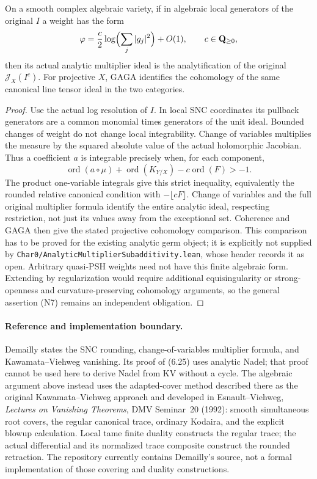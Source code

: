 \begin{lemma}
\label{lem:kn-nadel-algebraic-analytic-comparison}
\notready
On a smooth complex algebraic variety, if in algebraic local
generators of the original $I$ a weight has the form
\[
 \varphi=\frac c2\log\Bigl(\sum_j|g_j|^2\Bigr)+O(1),
 \qquad c\in\mathbf{Q}_{\geq0},
\]
then its actual analytic multiplier ideal is the analytification of
the original $\mathcal J_X(I^c)$.  For projective $X$, GAGA identifies
the cohomology of the same canonical line tensor ideal in the two
categories.
\end{lemma}
\begin{proof}
Use the actual log resolution of $I$.  In local SNC coordinates its
pullback generators are a common monomial times generators of the
unit ideal.  Bounded changes of weight do not change local
integrability.  Change of variables multiplies the measure by the
squared absolute value of the actual holomorphic Jacobian.  Thus a
coefficient $a$ is integrable precisely when, for each component,
\[
 \operatorname{ord}(a\circ\mu)
 +\operatorname{ord}(K_{Y/X})-c\operatorname{ord}(F)>-1.
\]
The product one-variable integrals give this strict inequality,
equivalently the rounded relative canonical condition with
$-\lfloor cF\rfloor$.  Change of variables and the full original
multiplier formula identify the entire analytic ideal, respecting
restriction, not just its values away from the exceptional set.
Coherence and GAGA then give the stated projective cohomology
comparison.  This comparison has to be proved for the existing
analytic germ object; it is explicitly not supplied by
\texttt{Char0/AnalyticMultiplierSubadditivity.lean}, whose header
records it as open.  Arbitrary quasi-PSH weights need not have this
finite algebraic form.  Extending by regularization would require
additional equisingularity or strong-openness and curvature-preserving
cohomology arguments, so the general assertion (N7) remains an
independent obligation.
\end{proof}

\paragraph{Reference and implementation boundary.}
Demailly \cite[\S6.D, especially (6.23)--(6.25)]{DemAM} states the
SNC rounding, change-of-variables multiplier formula, and
Kawamata--Viehweg vanishing.  Its proof of (6.25) uses analytic Nadel;
that proof cannot be used here to derive Nadel from KV without a
cycle.  The algebraic argument above instead uses the adapted-cover
method described there as the original Kawamata--Viehweg approach
and developed in Esnault--Viehweg, \emph{Lectures on Vanishing
Theorems}, DMV Seminar~20 (1992): smooth simultaneous root covers,
the regular canonical trace, ordinary Kodaira, and the explicit blowup
calculation.  Local tame finite duality constructs the regular trace;
the actual differential and its normalized trace composite construct
the rounded retraction.
The repository currently contains Demailly's source, not a formal
implementation of those covering and duality constructions.

